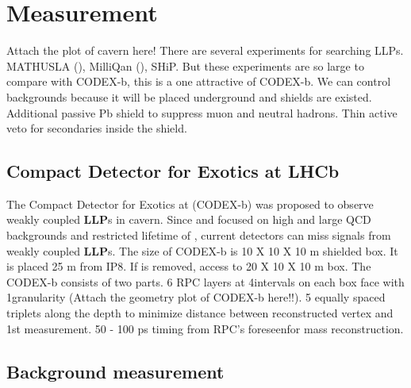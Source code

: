 \section{Measurement}
\label{sec:Measurement}

Attach the plot of cavern here! 
There are several experiments for searching LLPs. MATHUSLA (\atlas), MilliQan (\cms), SHiP. 
But these experiments are so large to compare with CODEX-b, this is a one attractive of CODEX-b. 
We can control backgrounds because it will be placed underground and shields are existed. 
Additional passive Pb shield to suppress muon and neutral hadrons. 
Thin active veto for secondaries inside the shield. 

\subsection{Compact Detector for Exotics at LHCb}

The Compact Detector for Exotics at \lhcb (CODEX-b) was proposed to observe weakly coupled \textbf{LLP}s in \lhcb cavern. 
Since \atlas and \cms focused on high \pt and large QCD backgrounds and restricted lifetime of \lhcb, current detectors can miss signals from weakly coupled \textbf{LLP}s. 
The size of CODEX-b is 10 X 10 X 10 m shielded box. It is placed 25 m from IP8. 
If \delphi is removed, access to 20 X 10 X 10 m box. 
The CODEX-b consists of two parts. 
6 RPC layers at 4\cm intervals on each box face with 1\cm granularity (Attach the geometry plot of CODEX-b here!!). 
5 equally spaced triplets along the depth to minimize distance between reconstructed vertex and 1st measurement. 
50 - 100 ps timing from RPC's foreseenfor mass reconstruction.

\subsection{Background measurement}

